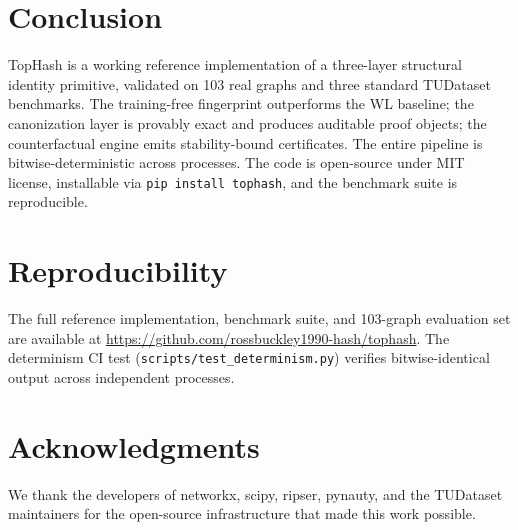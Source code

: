\documentclass[11pt]{article}
\begin{document}
\section{Conclusion}

TopHash is a working reference implementation of a three-layer structural identity primitive, validated on 103 real graphs and three standard TUDataset benchmarks. The training-free fingerprint outperforms the WL baseline; the canonization layer is provably exact and produces auditable proof objects; the counterfactual engine emits stability-bound certificates. The entire pipeline is bitwise-deterministic across processes. The code is open-source under MIT license, installable via \texttt{pip install tophash}, and the benchmark suite is reproducible.

\section*{Reproducibility}

The full reference implementation, benchmark suite, and 103-graph evaluation set are available at \url{https://github.com/rossbuckley1990-hash/tophash}. The determinism CI test (\texttt{scripts/test\_determinism.py}) verifies bitwise-identical output across independent processes.

\section*{Acknowledgments}

We thank the developers of networkx, scipy, ripser, pynauty, and the TUDataset maintainers for the open-source infrastructure that made this work possible.
\end{document}
